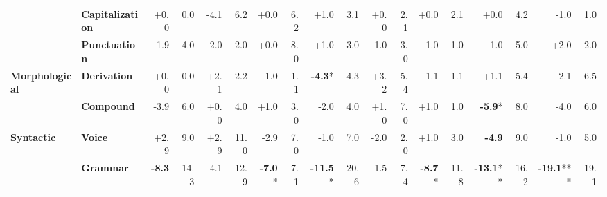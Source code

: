 \begin{table}[h]
{\begin{tabular}{llrrrrrrrrrrrrrrrr}
  & \textbf{Capitalization} & \cellcolor{red!0} +0.0 & \cellcolor{blue!0} 0.0 & \cellcolor{red!8} -4.1 & \cellcolor{blue!16} 6.2 & \cellcolor{red!0} +0.0 & \cellcolor{blue!16} 6.2 & \cellcolor{green!2} +1.0 & \cellcolor{blue!8} 3.1 & \cellcolor{red!0} +0.0 & \cellcolor{blue!5} 2.1 & \cellcolor{red!0} +0.0 & \cellcolor{blue!5} 2.1 & \cellcolor{red!0} +0.0 & \cellcolor{blue!11} 4.2 & \cellcolor{red!2} -1.0 & \cellcolor{blue!3} 1.0 \\
  & \textbf{Punctuation} & \cellcolor{red!3} -1.9 & \cellcolor{blue!10} 4.0 & \cellcolor{red!3} -2.0 & \cellcolor{blue!5} 2.0 & \cellcolor{red!0} +0.0 & \cellcolor{blue!21} 8.0 & \cellcolor{green!1} +1.0 & \cellcolor{blue!8} 3.0 & \cellcolor{red!1} -1.0 & \cellcolor{blue!8} 3.0 & \cellcolor{red!1} -1.0 & \cellcolor{blue!3} 1.0 & \cellcolor{red!1} -1.0 & \cellcolor{blue!13} 5.0 & \cellcolor{green!3} +2.0 & \cellcolor{blue!5} 2.0 \\
\midrule
\textbf{Morphological} & \textbf{Derivation} & \cellcolor{red!0} +0.0 & \cellcolor{blue!0} 0.0 & \cellcolor{green!4} +2.1 & \cellcolor{blue!6} 2.2 & \cellcolor{red!2} -1.0 & \cellcolor{blue!3} 1.1 & \cellcolor{red!8} \textbf{-4.3}* & \cellcolor{blue!11} 4.3 & \cellcolor{green!6} +3.2 & \cellcolor{blue!14} 5.4 & \cellcolor{red!2} -1.1 & \cellcolor{blue!3} 1.1 & \cellcolor{green!2} +1.1 & \cellcolor{blue!14} 5.4 & \cellcolor{red!4} -2.1 & \cellcolor{blue!17} 6.5 \\
  & \textbf{Compound} & \cellcolor{red!7} -3.9 & \cellcolor{blue!15} 6.0 & \cellcolor{red!0} +0.0 & \cellcolor{blue!10} 4.0 & \cellcolor{green!1} +1.0 & \cellcolor{blue!8} 3.0 & \cellcolor{red!3} -2.0 & \cellcolor{blue!10} 4.0 & \cellcolor{green!1} +1.0 & \cellcolor{blue!18} 7.0 & \cellcolor{green!1} +1.0 & \cellcolor{blue!3} 1.0 & \cellcolor{red!11} \textbf{-5.9}* & \cellcolor{blue!21} 8.0 & \cellcolor{red!7} -4.0 & \cellcolor{blue!15} 6.0 \\
\midrule
\textbf{Syntactic} & \textbf{Voice} & \cellcolor{green!5} +2.9 & \cellcolor{blue!23} 9.0 & \cellcolor{green!5} +2.9 & \cellcolor{blue!28} 11.0 & \cellcolor{red!5} -2.9 & \cellcolor{blue!18} 7.0 & \cellcolor{red!1} -1.0 & \cellcolor{blue!18} 7.0 & \cellcolor{red!3} -2.0 & \cellcolor{blue!5} 2.0 & \cellcolor{green!1} +1.0 & \cellcolor{blue!8} 3.0 & \cellcolor{red!9} \textbf{-4.9} & \cellcolor{blue!23} 9.0 & \cellcolor{red!1} -1.0 & \cellcolor{blue!13} 5.0 \\
  & \textbf{Grammar} & \cellcolor{red!16} \textbf{-8.3} & \cellcolor{blue!37} 14.3 & \cellcolor{red!8} -4.1 & \cellcolor{blue!33} 12.9 & \cellcolor{red!13} \textbf{-7.0}* & \cellcolor{blue!18} 7.1 & \cellcolor{red!20} \textbf{-11.5}* & \cellcolor{blue!53} 20.6 & \cellcolor{red!2} -1.5 & \cellcolor{blue!19} 7.4 & \cellcolor{red!17} \textbf{-8.7}* & \cellcolor{blue!30} 11.8 & \cellcolor{red!20} \textbf{-13.1}** & \cellcolor{blue!42} 16.2 & \cellcolor{red!20} \textbf{-19.1}*** & \cellcolor{blue!49} 19.1 \\

\end{tabular}}
\end{table}
